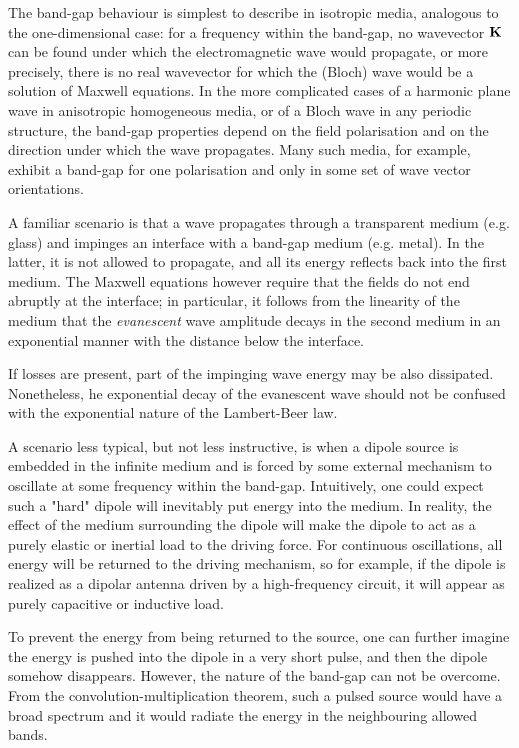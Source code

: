 The band-gap behaviour is simplest to describe in isotropic media, analogous to the one-dimensional case: for a frequency within the band-gap, no wavevector ${\mathbf{K}}$ can be found under which the electromagnetic wave would propagate, or more precisely, there is no real wavevector for which the (Bloch) wave would be a solution of Maxwell equations. In the more complicated cases of a harmonic plane wave in anisotropic homogeneous media, or of a Bloch wave in any periodic structure, the band-gap properties depend on the field polarisation and on the direction under which the wave propagates. Many such media, for example, exhibit a band-gap for one polarisation and only in some set of wave vector orientations.

A familiar scenario is that a wave propagates through a transparent medium (e.g. glass) and impinges an interface with a band-gap medium (e.g. metal). In the latter, it is not allowed to propagate, and all its energy reflects back into the first medium. The Maxwell equations however require that the fields do not end abruptly at the interface; in particular, it follows from the linearity of the medium that the \textit{evanescent} wave amplitude decays in the second medium in an exponential manner with the distance below the interface.

If losses are present, part of the impinging wave energy may be also dissipated. Nonetheless, he exponential decay of the evanescent wave should not be confused with the exponential nature of the Lambert-Beer law.

A scenario less typical, but not less instructive, is when a dipole source is embedded in the infinite medium and is forced by some external mechanism to oscillate at some frequency within the band-gap. Intuitively, one could expect such a "hard" dipole will inevitably put energy into the medium. In reality, the effect of the medium surrounding the dipole will make the dipole to act as a purely elastic or inertial load to the driving force. For continuous oscillations, all energy will be returned to the driving mechanism, so for example, if the dipole is realized as a dipolar antenna driven by a high-frequency circuit, it will appear as purely capacitive or inductive load. 

To prevent the energy from being returned to the source, one can further imagine the energy is pushed into the dipole in a very short pulse, and then the dipole somehow disappears. However, the nature of the band-gap can not be overcome. From the convolution-multiplication theorem, such a pulsed source would have a broad spectrum and it would radiate the energy in the neighbouring allowed bands. 

